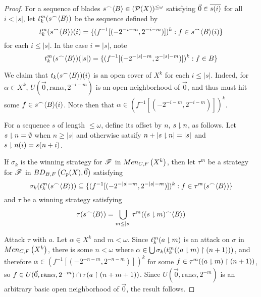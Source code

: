 \documentclass[11pt]{article}
\begin{document}
  \begin{proof}
    For a sequence of blades
    \(s{^\frown}\langle B\rangle\in(\mathcal{P}(X))^{\leq\omega}\) satisfying
    \(\vec 0\in \overline{s(i)}\) for all \(i<|s|\), let
    \(t_k^m(s{^\frown}\langle B\rangle)\) be the sequence defined by
      \[
        t_k^m(s{^\frown}\langle B\rangle)(i)
          =
        \{
          (f^{-1}[(-2^{-i-m},2^{-i-m})])^k
        :
          f\in s{^\frown}\langle B\rangle(i)
        \}
      \]
    for each \(i\leq|s|\). In the case \(i=|s|\), note
      \[
        t_k^m(s{^\frown}\langle B\rangle)(|s|)
          =
        \{
          (f^{-1}[(-2^{-|s|-m},2^{-|s|-m})])^k
        :
          f\in B
        \}
      \]

    We claim that \(t_k(s{^\frown}\langle B\rangle)(i)\) is an open cover of \(X^k\) for
    each \(i\leq|s|\).
    Indeed, for \(\alpha\in X^k\), \(U(\vec 0,\text{ran}\alpha,2^{-i-m})\) is
    an open neighborhood of \(\vec 0\), and thus must hit some
    \(f\in s{^\frown}\langle B\rangle(i)\). Note then that
    \(\alpha\in(f^{-1}[(-2^{-i-m},2^{-i-m})])^k\).

    For a sequence \(s\) of length \(\leq\omega\), define its offset by
    \(n\), \(s\downharpoonright n\), as follows. Let
    \(s\downharpoonright n=\emptyset\) when \(n\geq|s|\) and otherwise
    satsify \(n+|s\downharpoonright n|=|s|\) and \(s\downharpoonright n(i)=s(n+i)\).

    If \(\sigma_k\) is the winning strategy for \(\mathscr{F}\) in \(Men_{C,F}\left({X^k}\right)\),
    then let \(\tau^m\) be a strategy for \(\mathscr{F}\) in
    \(BD_{B,F}\left({C_p(X)},{\vec 0}\right)\) satisfying
      \[
        \sigma_k(t_k^m(s{^\frown}\langle B\rangle))
          \subseteq
        \{
          (f^{-1}[(-2^{-|s|-m},2^{-|s|-m})])^k
        :
          f\in \tau^m(s{^\frown}\langle B\rangle)
        \}
      \]
    and \(\tau\) be a winning strategy satisfying
      \[
        \tau(s{^\frown}\langle B\rangle)
          =
        \bigcup_{m\leq|s|}
        \tau^m((s\downharpoonright m){^\frown}\langle B\rangle)
      \]

    Attack \(\tau\) with \(a\). Let \(\alpha\in X^k\) and \(m<\omega\).
    Since \(t_k^m(a\downharpoonright m)\) is an attack on \(\sigma\) in
    \(Men_{C,F}\left({X^k}\right)\), there is some \(n<\omega\) where
    \(\alpha\in\bigcup\sigma_k(t_k^m((a\downharpoonright m)\restriction(n+1)))\),
    and therefore \(\alpha\in (f^{-1}[(-2^{-n-m},2^{-n-m})])^k\) for
    some \(f\in\tau^m((a\downharpoonright m)\restriction(n+1))\), so
    \(
      f
        \in
      U(\vec 0,\text{ran}\alpha,2^{-m})
        \cap
      \tau(a\restriction(n+m+1))
    \).
    Since \(U(\vec 0,\text{ran}\alpha,2^{-m})\) is an arbitrary basic
    open neighborhood of \(\vec 0\), the result follows.
  \end{proof}

\newpage


\end{document}
